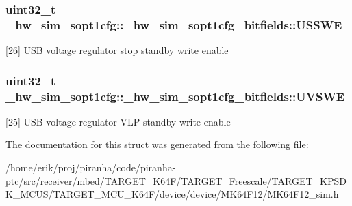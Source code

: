 \subsubsection[{\texorpdfstring{U\+S\+S\+WE}{USSWE}}]{\setlength{\rightskip}{0pt plus 5cm}uint32\+\_\+t \+\_\+hw\+\_\+sim\+\_\+sopt1cfg\+::\+\_\+hw\+\_\+sim\+\_\+sopt1cfg\+\_\+bitfields\+::\+U\+S\+S\+WE}\hypertarget{struct__hw__sim__sopt1cfg_1_1__hw__sim__sopt1cfg__bitfields_a3dfa779b90dc15433e33c9c4eec39584}{}\label{struct__hw__sim__sopt1cfg_1_1__hw__sim__sopt1cfg__bitfields_a3dfa779b90dc15433e33c9c4eec39584}
\mbox{[}26\mbox{]} U\+SB voltage regulator stop standby write enable 
\subsubsection[{\texorpdfstring{U\+V\+S\+WE}{UVSWE}}]{\setlength{\rightskip}{0pt plus 5cm}uint32\+\_\+t \+\_\+hw\+\_\+sim\+\_\+sopt1cfg\+::\+\_\+hw\+\_\+sim\+\_\+sopt1cfg\+\_\+bitfields\+::\+U\+V\+S\+WE}\hypertarget{struct__hw__sim__sopt1cfg_1_1__hw__sim__sopt1cfg__bitfields_a62e6be5c680df145223c22583bc726d6}{}\label{struct__hw__sim__sopt1cfg_1_1__hw__sim__sopt1cfg__bitfields_a62e6be5c680df145223c22583bc726d6}
\mbox{[}25\mbox{]} U\+SB voltage regulator V\+LP standby write enable 

The documentation for this struct was generated from the following file\+:\begin{DoxyCompactItemize}
\item 
/home/erik/proj/piranha/code/piranha-\/ptc/src/receiver/mbed/\+T\+A\+R\+G\+E\+T\+\_\+\+K64\+F/\+T\+A\+R\+G\+E\+T\+\_\+\+Freescale/\+T\+A\+R\+G\+E\+T\+\_\+\+K\+P\+S\+D\+K\+\_\+\+M\+C\+U\+S/\+T\+A\+R\+G\+E\+T\+\_\+\+M\+C\+U\+\_\+\+K64\+F/device/device/\+M\+K64\+F12/M\+K64\+F12\+\_\+sim.\+h\end{DoxyCompactItemize}
